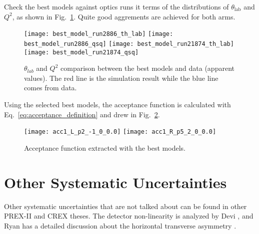Check the best models against optics runs it terms of the distributions of
$\theta_{\text{lab}}$ and $Q^2$, as shown in Fig.~\ref{fig:best_model_check}.
Quite good aggrements are achieved for both arms.
\begin{figure}[H]
    \centering
    \texttt{[image: best\_model\_run2886\_th\_lab]}
    \texttt{[image: best\_model\_run2886\_qsq]}
    \texttt{[image: best\_model\_run21874\_th\_lab]}
    \texttt{[image: best\_model\_run21874\_qsq]}
    \caption{$\theta_{lab}$ and $Q^2$ comparison between the best models and data (apparent values).
    The red line is the simulation result while the blue line comes from data.}
    \label{fig:best_model_check}
\end{figure}

Using the selected best models, the acceptance function is
calculated with Eq.~\ref{eq:acceptance_definition} and drew in Fig.~\ref{fig:acceptance_function}.
\begin{figure}[H]
    \centering
    \texttt{[image: acc1\_L\_p2\_-1\_0\_0.0]}
    \texttt{[image: acc1\_R\_p5\_2\_0\_0.0]}
    \caption{Acceptance function extracted with the best models.}
    \label{fig:acceptance_function}
\end{figure}

\section{Other Systematic Uncertainties}
Other systematic uncertainties that are not talked about can be found in other 
PREX-II and CREX theses. The detector non-linearity is analyzed by Devi \cite{Devi2021},
and Ryan has a detailed discussion about the horizontal transverse asymmetry \cite{Ryan2021}.

\begin{comment}
\begin{equation}
    Y = I + \alpha I^2 + \beta I^3 + \gamma I^4 + \cdots
\end{equation}
Non-linearity: $\alpha$, reduce it 
\begin{itemize}
    \item $\alpha=0.0028$ for Compton $\gamma$ detector
\end{itemize}
\end{comment}
